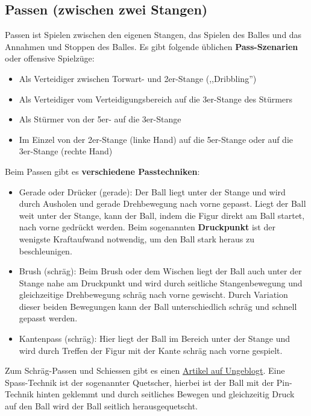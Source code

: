 \subsection{Passen (zwischen zwei Stangen)}
\label{technik:offensive:zwei}

Passen ist Spielen zwischen den eigenen Stangen, das Spielen des Balles und das Annahmen und Stoppen des Balles.
Es gibt folgende üblichen \textbf{Pass-Szenarien} oder {offensive Spielzüge}:
\begin{itemize}
    \item Als Verteidiger zwischen Torwart- und 2er-Stange (,,Dribbling'')
    \item Als Verteidiger vom Verteidigungsbereich auf die 3er-Stange des Stürmers
    \item Als Stürmer von der 5er- auf die 3er-Stange
    \item Im Einzel von der 2er-Stange (linke Hand) auf die 5er-Stange oder auf die 3er-Stange (rechte Hand)
\end{itemize}

Beim Passen gibt es \textbf{verschiedene Passtechniken}:
\begin{itemize}
    \item Gerade oder Drücker (gerade): Der Ball liegt unter der Stange und wird durch Ausholen und gerade Drehbewegung nach vorne gepasst. 
        Liegt der Ball weit unter der Stange, kann der Ball, indem die Figur direkt am Ball startet, nach vorne gedrückt werden. 
        Beim sogenannten \textbf{Druckpunkt} ist der wenigste Kraftaufwand notwendig, um den Ball stark heraus zu beschleunigen.
    \item Brush (schräg): Beim Brush oder dem Wischen liegt der Ball auch unter der Stange nahe am Druckpunkt und wird durch seitliche Stangenbewegung und gleichzeitige Drehbewegung schräg nach vorne gewischt.  
        Durch Variation dieser beiden Bewegungen kann der Ball unterschiedlich schräg und schnell gepasst werden.
    \item Kantenpass (schräg): Hier liegt der Ball im Bereich unter der Stange und wird durch Treffen der Figur mit der Kante schräg nach vorne gespielt.
\end{itemize}
Zum Schräg-Passen und Schiessen gibt es einen \href{http://ungeblogtkickern.blogspot.de/2015/09/schrag-schieen.html}{Artikel auf Ungeblogt}.
Eine Spass-Technik ist der sogenannter Quetscher, hierbei ist der Ball mit der Pin-Technik hinten geklemmt und durch seitliches Bewegen und gleichzeitig Druck auf den Ball wird der Ball seitlich herausgequetscht.

